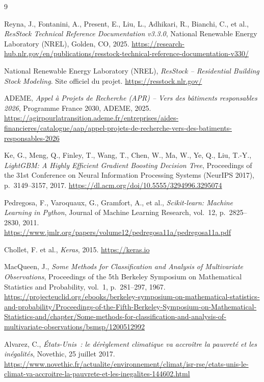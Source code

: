 \begin{thebibliography}{9}

Reyna, J., Fontanini, A., Present, E., Liu, L., Adhikari, R., Bianchi, C., et al.,
\textit{ResStock Technical Reference Documentation v3.3.0}, National Renewable Energy Laboratory
(NREL), Golden, CO, 2025.
\url{https://research-hub.nlr.gov/en/publications/resstock-technical-reference-documentation-v330/}

National Renewable Energy Laboratory (NREL), \textit{ResStock -- Residential Building Stock
Modeling}. Site officiel du projet.
\url{https://resstock.nlr.gov/}

ADEME, \textit{Appel à Projets de Recherche (APR) -- Vers des bâtiments responsables 2026},
Programme France 2030, ADEME, 2025.
\url{https://agirpourlatransition.ademe.fr/entreprises/aides-financieres/catalogue/aap/appel-projets-de-recherche-vers-des-batiments-responsables-2026}

Ke, G., Meng, Q., Finley, T., Wang, T., Chen, W., Ma, W., Ye, Q., Liu, T.-Y., \textit{LightGBM: A
Highly Efficient Gradient Boosting Decision Tree}, Proceedings of the 31st Conference on Neural
Information Processing Systems (NeurIPS 2017), p.~3149--3157, 2017.
\url{https://dl.acm.org/doi/10.5555/3294996.3295074}

Pedregosa, F., Varoquaux, G., Gramfort, A., et al., \textit{Scikit-learn: Machine Learning in
Python}, Journal of Machine Learning Research, vol.~12, p.~2825--2830, 2011.
\url{https://www.jmlr.org/papers/volume12/pedregosa11a/pedregosa11a.pdf}

Chollet, F. et al., \textit{Keras}, 2015.
\url{https://keras.io}

MacQueen, J., \textit{Some Methods for Classification and Analysis of Multivariate Observations},
Proceedings of the 5th Berkeley Symposium on Mathematical Statistics and Probability, vol.~1,
p.~281--297, 1967.
\url{https://projecteuclid.org/ebooks/berkeley-symposium-on-mathematical-statistics-and-probability/Proceedings-of-the-Fifth-Berkeley-Symposium-on-Mathematical-Statistics-and/chapter/Some-methods-for-classification-and-analysis-of-multivariate-observations/bsmsp/1200512992}

Alvarez, C., \textit{États-Unis~: le dérèglement climatique va accroître la pauvreté et les
inégalités}, Novethic, 25 juillet 2017.
\url{https://www.novethic.fr/actualite/environnement/climat/isr-rse/etats-unis-le-climat-va-accroitre-la-pauvrete-et-les-inegalites-144602.html}

\end{thebibliography}

